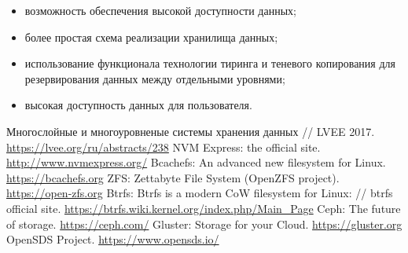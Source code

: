 \documentclass[10pt, a5paper]{article}
\begin{document}
\begin{itemize}
  \item возможность обеспечения высокой доступности данных;
  \item более простая схема реализации хранилища данных;
  \item использование функционала технологии тиринга и теневого копирования для резервирования данных между отдельными уровнями;
  \item высокая доступность данных для пользователя.
\end{itemize}

\begin{thebibliography}{20}
 Многослойные и многоуровненые системы хранения данных // LVEE 2017. \url{https://lvee.org/ru/abstracts/238}
 NVM Express: the official site. \url{http://www.nvmexpress.org/}
 Bcachefs: An advanced new filesystem for Linux. \url{https://bcachefs.org}
 ZFS: Zettabyte File System (OpenZFS project). \url{https://open-zfs.org}
 Btrfs: Btrfs is a modern CoW filesystem for Linux: // btrfs official site. \url{https://btrfs.wiki.kernel.org/index.php/Main\_Page}
 Ceph: The future of storage. \url{https://ceph.com/}
 Gluster: Storage for your Cloud. \url{https://gluster.org}
 OpenSDS Project. \url{https://www.opensds.io/}
\end{thebibliography}
\end{document}
